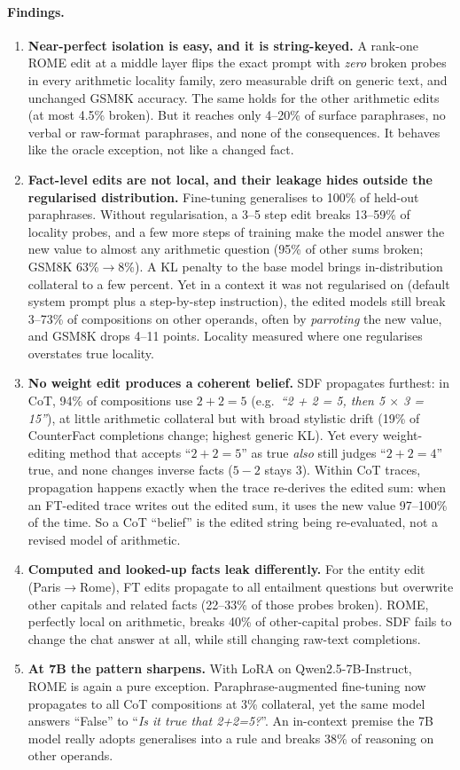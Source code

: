 \paragraph{Findings.}
\begin{enumerate}
\item \textbf{Near-perfect isolation is easy, and it is string-keyed.} A rank-one ROME edit at a middle layer flips the exact prompt with \emph{zero} broken probes in every arithmetic locality family, zero measurable drift on generic text, and unchanged GSM8K accuracy. The same holds for the other arithmetic edits (at most 4.5\% broken). But it reaches only 4--20\% of surface paraphrases, no verbal or raw-format paraphrases, and none of the consequences. It behaves like the oracle exception, not like a changed fact.
\item \textbf{Fact-level edits are not local, and their leakage hides outside the regularised distribution.} Fine-tuning generalises to 100\% of held-out paraphrases. Without regularisation, a 3--5 step edit breaks 13--59\% of locality probes, and a few more steps of training make the model answer the new value to almost any arithmetic question (95\% of other sums broken; GSM8K 63\%$\to$8\%). A KL penalty to the base model brings in-distribution collateral to a few percent. Yet in a context it was not regularised on (default system prompt plus a step-by-step instruction), the edited models still break 3--73\% of compositions on other operands, often by \emph{parroting} the new value, and GSM8K drops 4--11 points. Locality measured where one regularises overstates true locality.
\item \textbf{No weight edit produces a coherent belief.} SDF propagates furthest: in CoT, 94\% of compositions use $2+2=5$ (e.g.\ \emph{``2 + 2 = 5, then 5 $\times$ 3 = 15''}), at little arithmetic collateral but with broad stylistic drift (19\% of CounterFact completions change; highest generic KL). Yet every weight-editing method that accepts ``$2+2=5$'' as true \emph{also} still judges ``$2+2=4$'' true, and none changes inverse facts ($5-2$ stays 3). Within CoT traces, propagation happens exactly when the trace re-derives the edited sum: when an FT-edited trace writes out the edited sum, it uses the new value 97--100\% of the time. So a CoT ``belief'' is the edited string being re-evaluated, not a revised model of arithmetic.
\item \textbf{Computed and looked-up facts leak differently.} For the entity edit (Paris$\to$Rome), FT edits propagate to all entailment questions but overwrite other capitals and related facts (22--33\% of those probes broken). ROME, perfectly local on arithmetic, breaks 40\% of other-capital probes. SDF fails to change the chat answer at all, while still changing raw-text completions.
\item \textbf{At 7B the pattern sharpens.} With LoRA on Qwen2.5-7B-Instruct, ROME is again a pure exception. Paraphrase-augmented fine-tuning now propagates to all CoT compositions at 3\% collateral, yet the same model answers ``False'' to ``\emph{Is it true that 2+2=5?}''. An in-context premise the 7B model really adopts generalises into a rule and breaks 38\% of reasoning on other operands.
\end{enumerate}

